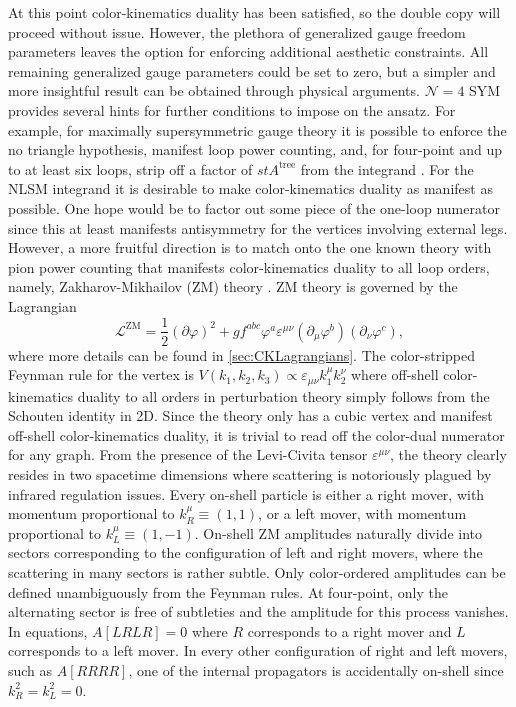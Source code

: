 \documentclass[11pt,letter]{article}
\newcommand{\atree}{\ensuremath{A^{\text{tree}}}}
\begin{document}
At this point color-kinematics duality has been satisfied, so the
double copy will proceed without issue.  However, the plethora of
generalized gauge freedom parameters leaves the option for enforcing
additional aesthetic constraints.  All remaining generalized gauge
parameters could be set to zero, but a simpler and more insightful
result can be obtained through physical arguments.  $\mathcal{N}=4$
SYM provides several hints for further conditions to impose on the
ansatz.  For example, for maximally supersymmetric gauge theory it is
possible to enforce the no triangle hypothesis, manifest loop power
counting, and, for four-point and up to at least six loops, strip off
a factor of $st \atree$ from the integrand \cite{FiveLoopN4,
  Bern:2012uf, Bern:2010fy, SuperSum, Carrasco:2021otn,
  JJHenrikReview, BRY, BDDPR, Neq44np}.  For the NLSM integrand it is
desirable to make color-kinematics duality as manifest as possible.
One hope would be to factor out some piece of the one-loop numerator
since this at least manifests antisymmetry for the vertices involving
external legs.  However, a more fruitful direction is to match onto
the one known theory with pion power counting that manifests
color-kinematics duality to all loop orders, namely,
Zakharov-Mikhailov (ZM) theory \cite{Zakharov:1973pp,
  Cheung:2022mix}. ZM theory is governed by the Lagrangian
\begin{equation}
\label{eq:ZMLagrangian}
\mathcal{L}^{\text{ZM}} = \frac{1}{2}(\partial \varphi)^2
+ g f^{abc} \varphi^a \varepsilon^{\mu\nu}(\partial_\mu \varphi^b)( \partial_\nu \varphi^c),
\end{equation}
where more details can be found in \cref{sec:CKLagrangians}.  The
color-stripped Feynman rule for the vertex is
$V(k_1, k_2, k_3) \propto \varepsilon_{\mu\nu}k_1^\mu k_2^\nu$ where
off-shell color-kinematics duality to all orders in perturbation
theory simply follows from the Schouten identity in 2D.  Since the theory
only has a cubic vertex and manifest off-shell color-kinematics
duality, it is trivial to read off the color-dual numerator for any
graph.  From the presence of the Levi-Civita tensor
$\varepsilon^{\mu\nu}$, the theory clearly resides in two spacetime
dimensions where scattering is notoriously plagued by infrared
regulation issues.  Every on-shell particle is either a right mover,
with momentum proportional to $k_R^\mu \equiv (1,1)$, or a left mover,
with momentum proportional to $k_L^\mu \equiv (1,-1)$.  On-shell ZM
amplitudes naturally divide into sectors corresponding to the
configuration of left and right movers, where the scattering in many
sectors is rather subtle.  Only color-ordered amplitudes can be
defined unambiguously from the Feynman rules.  At four-point, only the
alternating sector is free of subtleties and the amplitude for this
process vanishes.  In equations, $A[LRLR]=0$ where $R$ corresponds to
a right mover and $L$ corresponds to a left mover.  In every other
configuration of right and left movers, such as $A[RRRR]$, one of the
internal propagators is accidentally on-shell since $k_R^2=k_L^2=0$.
\end{document}
